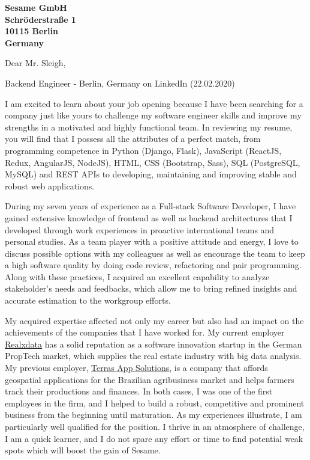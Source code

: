 \documentclass[a4paper]{joaosoares-letter}
\begin{document}
\longindentation=0pt

\begin{letter}{\bfseries Sesame GmbH\\Schröderstraße 1\\10115 Berlin\\Germany}


\date{Berlin, \today}


\opening{Dear Mr. Sleigh,}{Backend Engineer - Berlin, Germany on LinkedIn (22.02.2020)}

I am excited to learn about your job opening because I have been searching for a
company just like yours to challenge my software engineer skills and improve my
strengths in a motivated and highly functional team. In reviewing my resume, you will find
that I possess all the attributes of a perfect match, from programming competence in
Python (Django, Flask), JavaScript (ReactJS, Redux, AngularJS,
NodeJS), HTML, CSS (Bootstrap, Sass), SQL (PostgreSQL, MySQL) and REST APIs to
developing, maintaining and improving stable and robust web applications.

During my seven years of experience as a Full-stack Software Developer, I have gained extensive knowledge of frontend as well as backend architectures that I developed through work experiences in proactive international teams and personal studies. As a team player with a positive attitude and energy, I love to discuss possible options with my colleagues as well as encourage the team to keep a high software quality by doing code review, refactoring and pair programming. Along with these practices, I acquired an excellent capability to analyze stakeholder's needs and feedbacks, which allow me to bring refined insights and accurate estimation to the workgroup efforts.

My acquired expertise affected not only my career but also had an impact on the achievements of the companies that I have worked for. My current employer \href{https://www.realxdata.com/}{Realxdata} has a solid reputation as a software innovation startup in the German PropTech market, which supplies the real estate industry with big data analysis. My previous employer, \href{http://terras.agr.br/}{Terras App Solutions}, is a company that affords geospatial applications for the Brazilian agribusiness market and helps farmers track their productions and finances. In both cases, I was one of the first employees in the firm, and I helped to build a robust, competitive and prominent business from the beginning until maturation. As my experiences illustrate, I am particularly well qualified for the position. I thrive in an atmosphere of challenge, I am a quick learner, and I do not spare any effort or time to find potential weak spots which will boost the gain of Sesame.


\end{letter}
\end{document}
